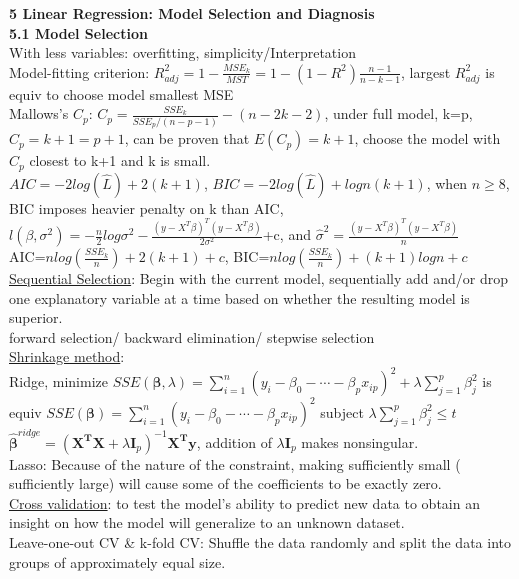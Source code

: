\documentclass[10pt,a4paper,landscape]{article}
\begin{document}
\begin{multicols}{3}
{  {\small\textbf{5 Linear Regression: Model Selection and Diagnosis}}\\
  \textbf{5.1 Model Selection}\\
  With less variables: overfitting, simplicity/Interpretation \\
  Model-fitting criterion: $R^2_{adj}=1-\frac{MSE_k}{MST}=1-(1-R^2)\frac{n-1}{n-k-1} $, largest $R^2_{adj}$ is equiv to choose model smallest MSE\\
  Mallows's $C_p$: $C_p=\frac{SSE_k}{SSE_p/(n-p-1)}-(n-2k-2)$, under full model, k=p, $C_p=k+1=p+1$, can be proven that $E(C_p)=k+1$, choose the model with $C_p$ closest to k+1 and k is small.\\
  $AIC=-2log(\hat{L})+2(k+1)$, $BIC=-2log(\hat{L})+logn(k+1)$, when $n\geq 8$, BIC imposes heavier penalty on k than AIC, $l(\beta,\sigma^2)=-\frac{n}{2}log \sigma^2 -\frac{(y-X^T\beta)^T(y-X^T\beta)}{2\sigma^2} $+c, and $\hat{\sigma}^2=\frac{(y-X^T\beta)^T(y-X^T\beta)}{n}$ \\
  AIC=$nlog(\frac{SSE_k}{n})+2(k+1)+c$, BIC=$nlog(\frac{SSE_k}{n})+(k+1)log n+c$
  \underline{Sequential Selection}: Begin with the current model, sequentially add and/or drop one explanatory variable at a time based on whether the resulting model is superior.\\
  forward selection/ backward elimination/ stepwise selection\\
  \underline{Shrinkage method}: \\ 
  Ridge, minimize $SSE(\boldsymbol{\beta}, \lambda)=\sum_{i=1}^n(y_i-\beta_0-\cdots-\beta_px_{ip})^2+\lambda \sum_{j=1}^p \beta_j^2$ is equiv $SSE(\boldsymbol{\beta})=\sum_{i=1}^n(y_i-\beta_0-\cdots-\beta_px_{ip})^2$ subject $\lambda \sum_{j=1}^p \beta_j^2\leq t$\\
  $\hat{\boldsymbol{\beta}}^{ridge}=(\boldsymbol{X^TX}+\lambda \boldsymbol{I}_p)^{-1}\boldsymbol{X^Ty}$, addition of $\lambda \boldsymbol{I}_p$ makes nonsingular.\\
  Lasso: Because of the nature of the constraint, making  sufficiently small ( sufficiently large) will cause
  some of the coefficients to be exactly zero. \\
  \underline{Cross validation}: to test the model’s ability to predict new data to obtain an insight on how the model will generalize to an unknown dataset. \\
  Leave-one-out CV \& k-fold CV: Shuffle the data randomly and split the data into  groups of approximately equal size.\\
  
}
\end{multicols}
\end{document}

